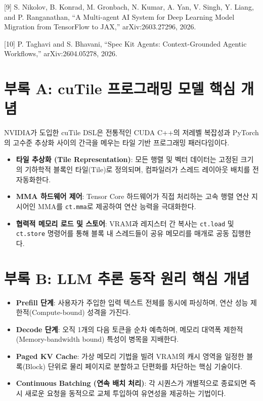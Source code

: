 \documentclass{kcc} %
\begin{document}
[9] S. Nikolov, B. Konrad, M. Gronbach, N. Kumar, A. Yan, V. Singh, Y. Liang, and P. Ranganathan, “A Multi-agent AI System for Deep Learning Model Migration from TensorFlow to JAX,” arXiv:2603.27296, 2026.


[10] P. Taghavi and S. Bhavani, “Spec Kit Agents: Context-Grounded Agentic Workflows,” arXiv:2604.05278, 2026.


\section*{부록 A: cuTile 프로그래밍 모델 핵심 개념}

NVIDIA가 도입한 cuTile DSL은 전통적인 CUDA C++의 저레벨 복잡성과 PyTorch의 고수준 추상화 사이의 간극을 메우는 타일 기반 프로그래밍 패러다임이다.


\begin{itemize}
\item \textbf{타일 추상화 (Tile Representation)}: 모든 행렬 및 벡터 데이터는 고정된 크기의 기하학적 블록인 타일(Tile)로 정의되며, 컴파일러가 스레드 레이아웃 배치를 전 자동화한다.
\item \textbf{MMA 하드웨어 제어}: Tensor Core 하드웨어가 직접 처리하는 고속 행렬 연산 지시어인 MMA를 \texttt{ct.mma}로 제공하여 연산 능력을 극대화한다.
\item \textbf{협력적 메모리 로드 및 스토어}: VRAM과 레지스터 간 복사는 \texttt{ct.load} 및 \texttt{ct.store} 명령어를 통해 블록 내 스레드들이 공유 메모리를 매개로 공동 집행한다.
\end{itemize}


\section*{부록 B: LLM 추론 동작 원리 핵심 개념}

\begin{itemize}
\item \textbf{Prefill 단계}: 사용자가 주입한 입력 텍스트 전체를 동시에 파싱하며, 연산 성능 제한적(Compute-bound) 성격을 가진다.
\item \textbf{Decode 단계}: 오직 1개의 다음 토큰을 순차 예측하며, 메모리 대역폭 제한적(Memory-bandwidth bound) 특성이 병목을 지배한다.
\item \textbf{Paged KV Cache}: 가상 메모리 기법을 빌려 VRAM의 캐시 영역을 일정한 블록(Block) 단위로 물리 페이지로 분할하고 단편화를 차단하는 핵심 기술이다.
\item \textbf{Continuous Batching (연속 배치 처리)}: 각 시퀀스가 개별적으로 종료되면 즉시 새로운 요청을 동적으로 교체 투입하여 유연성을 제공하는 기법이다.
\end{itemize}
\end{document}
